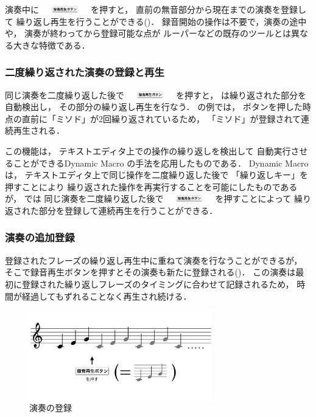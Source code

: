 演奏中に
\includegraphics[height=3mm,width=20mm,bb=3 23 360 80]{images/recbutton.png}
を押すと，
直前の無音部分から現在までの演奏を登録して
繰り返し再生を行うことができる()．
%
録音開始の操作は不要で，演奏の途中や，
演奏が終わってから登録可能な点が
ルーパーなどの既存のツールとは異なる大きな特徴である．

\subsubsection{二度繰り返された演奏の登録と再生}

同じ演奏を二度繰り返した後で
\includegraphics[height=3mm,width=20mm,bb=3 23 360 80]{images/recbutton.png}
を押すと，
{\system}は繰り返された部分を自動検出し，
その部分の繰り返し再生を行なう．
の例では，
ボタンを押した時点の直前に「ミソド」が2回繰り返されているため，
「ミソド」が登録されて連続再生される．

この機能は，
テキストエディタ上での操作の繰り返しを検出して
自動実行させることができるDynamic Macro\cite{masui}
の手法を応用したものである．
Dynamic Macroは，
テキストエディタ上で同じ操作を二度繰り返した後で
「繰り返しキー」を押すことにより
繰り返された操作を再実行することを可能にしたものであるが，
{\system}では
同じ演奏を二度繰り返した後で
\includegraphics[height=3mm,width=20mm,bb=3 23 360 80]{images/recbutton.png}
を押すことによって
繰り返された部分を登録して連続再生を行うことができる．

\subsubsection{演奏の追加登録}

登録されたフレーズの繰り返し再生中に重ねて演奏を行なうことができるが，
そこで録音再生ボタンを押すとその演奏も新たに登録される()．
この演奏は最初に登録された繰り返しフレーズのタイミングに合わせて記録されるため，
時間が経過してもずれることなく再生され続ける．

\begin{figure}[tb]
\includegraphics[width=8cm,bb=0 0 1001 482]{images/rp1.png}
\centering
\caption{演奏の登録}
\label{recplay1}
\end{figure}

